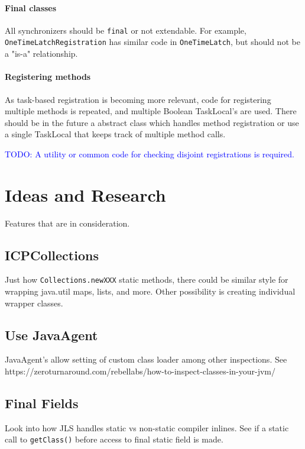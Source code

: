 \documentclass[9pt, twoside, a4paper]{article}
\begin{document}
    \paragraph*{Final classes}
    All synchronizers should be \lstinline{final} or not extendable. For example,
    \lstinline{OneTimeLatchRegistration} has similar code in \lstinline{OneTimeLatch},
    but should not be a "is-a" relationship.

    \paragraph*{Registering methods}
    As task-based registration is becoming more relevant, code for registering multiple methods is
    repeated, and multiple Boolean TaskLocal's are used. There should be in the future a abstract
    class which handles method registration or use a single TaskLocal that keeps track of multiple
    method calls.

    \textcolor{blue}{TODO: A utility or common code for checking disjoint registrations is required.}

    \section{Ideas and Research}
    Features that are in consideration.

    \subsection{ICPCollections}
    Just how \verb|Collections.newXXX| static methods, there could be similar style for wrapping java.util
    maps, lists, and more. Other possibility is creating individual wrapper classes.

    \subsection{Use JavaAgent}
    JavaAgent's allow setting of custom class loader among other inspections. See
    https://zeroturnaround.com/rebellabs/how-to-inspect-classes-in-your-jvm/

    \subsection{Final Fields}
    Look into how JLS handles static vs non-static compiler inlines.
    See if a static call to \verb|getClass()| before
    access to final static field is made.
\end{document}
